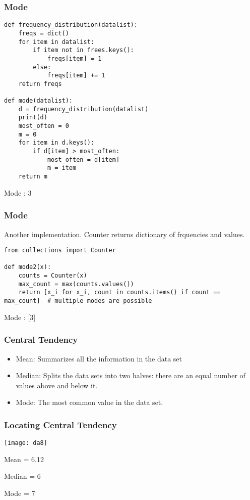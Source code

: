 \begin{frame}[fragile]\frametitle{Mode}
\begin{lstlisting}
def frequency_distribution(datalist):
	freqs = dict()
	for item in datalist:
		if item not in frees.keys():
			freqs[item] = 1
		else:
			freqs[item] += 1
	return freqs

def mode(datalist):
    d = frequency_distribution(datalist)
    print(d)
    most_often = 0
    m = 0
    for item in d.keys():
        if d[item] > most_often:
            most_often = d[item]
            m = item
    return m
\end{lstlisting}
Mode : 3
\end{frame}

\begin{frame}[fragile]\frametitle{Mode}
Another implementation. Counter returns dictionary of frquencies and values.
\begin{lstlisting}
from collections import Counter

def mode2(x):
    counts = Counter(x)
    max_count = max(counts.values())
    return [x_i for x_i, count in counts.items() if count == max_count]  # multiple modes are possible
\end{lstlisting}
Mode : [3]
\end{frame}



\begin{frame}[fragile]\frametitle{Central Tendency}	

\begin{itemize}
\item Mean: Summarizes all the information in the data set
\item Median: Splits the data sets into two halves: there are an equal number of values above and below it.
\item Mode: The most common value in the data set.
\end{itemize}


\end{frame}

\begin{frame}[fragile]\frametitle{Locating Central Tendency}	
\begin{center}
\texttt{[image: da8]}
\end{center}
Mean = 6.12		

Median = 6		

Mode = 7

\end{frame}

